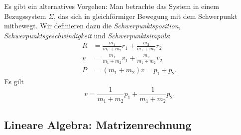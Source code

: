 \begin{beispiel}
Es gibt ein alternatives Vorgehen: Man betrachte das System in einem Bezugssystem $\Sigma$, das sich in gleichförmiger Bewegung mit dem Schwerpunkt mitbewegt. 
Wir definieren dazu die \emph{Schwerpunktsposition}, \emph{Schwerpunktsgeschwindigkeit} und \emph{Schwerpunktsimpuls}:
\begin{equation}
	\begin{split}
		R &= \frac{m_1}{m_1+m_2}r_1 + \frac{m_2}{m_1+m_2}r_2 \\
		v &= \frac{m_1}{m_1+m_2}v_1 + \frac{m_2}{m_1+m_2}v_2 \\
		P &= (m_1+m_2)v = p_1+p_2. 
	\end{split}
\end{equation}
Es gilt
\begin{equation}
v = \frac{1}{m_1+m_2}p_1 + \frac{1}{m_1+m_2}p_2.
\end{equation}
\end{beispiel}

\subsection{Lineare Algebra: Matrizenrechnung}

